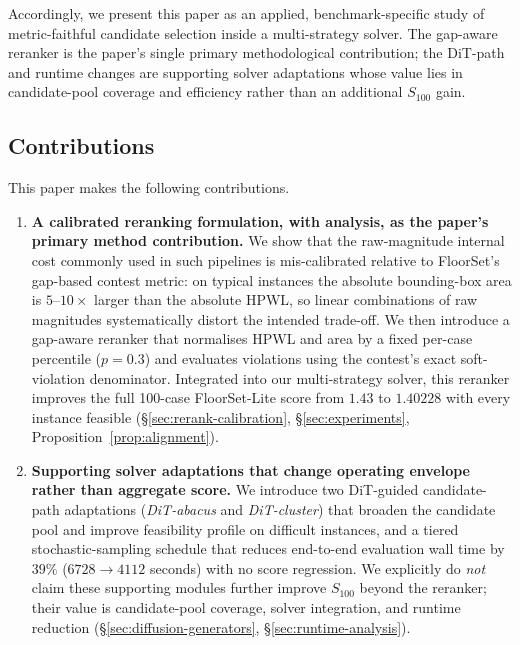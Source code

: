 \documentclass[nolineno]{ieeeaccess}
\begin{document}
Accordingly, we present this paper as an applied, benchmark-specific
study of metric-faithful candidate selection inside a multi-strategy
solver. The gap-aware reranker is the paper's single primary
methodological contribution; the DiT-path and runtime changes are
supporting solver adaptations whose value lies in candidate-pool
coverage and efficiency rather than an additional $S_{100}$ gain.

\subsection{Contributions}
This paper makes the following contributions.
\begin{enumerate}
    \item \textbf{A calibrated reranking formulation, with analysis,
    as the paper's primary method contribution.} We show that the
    raw-magnitude internal cost commonly used in such pipelines is
    mis-calibrated relative to FloorSet's gap-based contest metric:
    on typical instances the absolute bounding-box area is
    $5$--$10\times$ larger than the absolute HPWL, so linear
    combinations of raw magnitudes systematically distort the intended
    trade-off. We then introduce a gap-aware reranker that normalises
    HPWL and area by a fixed per-case percentile ($p=0.3$) and
    evaluates violations using the contest's exact soft-violation
    denominator. Integrated into our multi-strategy solver, this
    reranker improves the full 100-case FloorSet-Lite score from
    $1.43$ to $\mathbf{1.40228}$ with every instance feasible
    (\S\ref{sec:rerank-calibration}, \S\ref{sec:experiments},
    Proposition~\ref{prop:alignment}).

    \item \textbf{Supporting solver adaptations that change operating
    envelope rather than aggregate score.} We introduce two DiT-guided
    candidate-path adaptations (\emph{DiT-abacus} and
    \emph{DiT-cluster}) that broaden the candidate pool and improve
    feasibility profile on difficult instances, and a tiered
    stochastic-sampling schedule that reduces end-to-end evaluation wall
    time by $39\%$ ($6728 \to 4112$ seconds) with no score regression.
    We explicitly do \emph{not} claim these supporting modules further
    improve $S_{100}$ beyond the reranker; their value is candidate-pool
    coverage, solver integration, and runtime reduction
    (\S\ref{sec:diffusion-generators}, \S\ref{sec:runtime-analysis}).


\end{enumerate}
\end{document}
